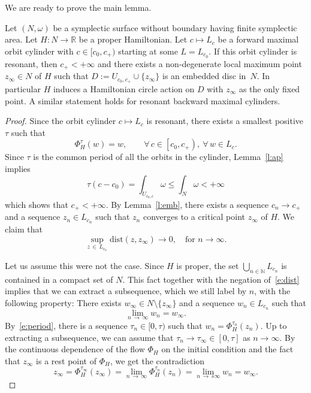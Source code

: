 \documentclass[AHL,Unicode,longabstracts,published]{cedram}
\newcommand{\N}{\mathbb{N}}
\newcommand{\R}{\mathbb{R}}
\newcommand{\dist}{\mathrm{dist}}
\let\oldforall\forall
\renewcommand*{\forall}{\mathrel{\oldforall}}
\begin{document}
We are ready to prove the main lemma.

\begin{lemm}\label{l:main}
Let $(N,\omega)$ be a symplectic surface without boundary having finite symplectic area. Let $H:N\to\R$ be a proper Hamiltonian. Let $c\mapsto L_c$ be a forward maximal orbit cylinder with $c\in[c_0,c_+)$ starting at some $L=L_{c_0}$. If this orbit cylinder is resonant, then $c_+<+\infty$ and there exists a non-degenerate local maximum point $z_\infty\in N$ of $H$ such that $D:=U_{c_0,c_+}\cup\{z_\infty\}$ is an embedded disc in~$N$. In particular $H$ induces a Hamiltonian circle action on $D$ with $z_\infty$ as the only fixed point. A similar statement holds for resonant backward maximal cylinders.
\end{lemm}


\begin{proof}
Since the orbit cylinder $c\mapsto L_c$ is resonant, there exists a smallest positive $\tau$ such that
\begin{equation}\label{e:period}
\Phi^\tau_H(w)=w,\qquad \forall\,c\in\left[c_0,c_+\right),\ \forall\, w\in L_c.
\end{equation}
Since $\tau$ is the common period of all the orbits in the cylinder, Lemma~\ref{l:ap} implies
\[
\tau \left(c-c_0\right)=\int_{U_{c_0,c}}\omega\leq \int_N\omega<+\infty
\]
which shows that $c_+<+\infty$. By Lemma~\ref{l:emb}, there exists a sequence $c_n\to c_+$ and a sequence $z_n\in L_{c_n}$ such that $z_n$ converges to a critical point $z_\infty$ of $H$. We claim that
\begin{equation}\label{e:dist}
\sup_{z\,\in\,L_{c_n}}\dist\left(z,z_\infty\right)\to0,\quad \text{for }n\to\infty.
\end{equation}

Let us assume this were not the case. Since $H$ is proper, the set $\bigcup_{n\in\N}L_{c_n}$ is contained in a compact set of $N$. This fact together with the negation of~\eqref{e:dist} implies that we can extract a subsequence, which we still label by $n$, with the following property: There exists $w_\infty\in N\setminus\{z_\infty\}$ and a sequence $w_n\in L_{c_n}$ such that
\[
\lim_{n\,\to\,\infty}w_n=w_\infty.
\]
By~\eqref{e:period}, there is a sequence $\tau_n\in[0,\tau)$ such that $w_n=\Phi^{\tau_n}_H(z_n)$. Up to extracting a subsequence, we can assume that $\tau_n\to\tau_\infty\in[0,\tau]$ as $n\to\infty$. By the continuous dependence of the flow $\Phi_H$ on the initial condition and the fact that $z_\infty$ is a rest point of $\Phi_H$, we get the contradiction
\[
z_\infty=\Phi^{\tau_\infty}_H(z_\infty)=\lim_{n\,\to\,\infty}\Phi^{\tau_n}_H(z_n)=\lim_{n\,\to\,s\infty}w_n=w_\infty.
\]


\end{proof}
\end{document}
